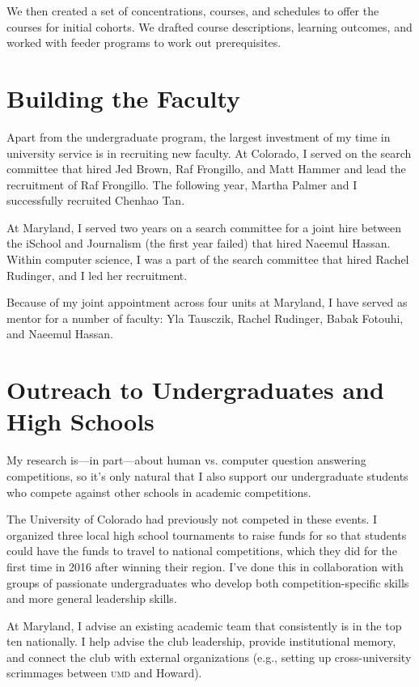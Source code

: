 \documentclass[11pt]{amsart}
\newcommand{\abr}[1]{\textsc{#1}}
\begin{document}
We then created a set of concentrations, courses, and schedules to offer the
courses for initial cohorts.  We drafted course descriptions, learning outcomes,
and worked with feeder programs to work out prerequisites.  

\section{Building the Faculty}

Apart from the undergraduate program, the largest investment of my
time in university service is in recruiting new faculty.
%
At Colorado, I served on the search committee that 
hired Jed Brown, Raf Frongillo, and Matt Hammer and lead the
recruitment of Raf Frongillo.
%
The following year, Martha Palmer and I successfully recruited Chenhao
Tan.

At Maryland, I served two years on a search committee for a joint hire
between the iSchool and Journalism (the first year failed) that hired
Naeemul Hassan.
%
Within computer science, I was a part of the search committee that
hired Rachel Rudinger, and I led her recruitment.

Because of my joint appointment across four units at Maryland, I have served as mentor
for a number of faculty: Yla Tausczik, Rachel Rudinger, Babak Fotouhi,
and Naeemul Hassan.


\section{Outreach to Undergraduates and High Schools}


My research is---in part---about human vs. computer question answering
competitions, so it's only natural that I also support our
undergraduate students who compete against other schools in academic
competitions.

The University of Colorado had previously not competed in these
events.
%
I organized three local high school tournaments to raise funds for so that
students could have the funds to travel to national competitions, which
they did for the first time in 2016 after winning their region.
%
I've done this in collaboration with groups of passionate
undergraduates who develop both competition-specific skills and more
general leadership skills.

At Maryland, I advise an existing academic team that
consistently is in the top ten nationally.
%
I help advise the club leadership, provide institutional memory, and
connect the club with external organizations (e.g., setting up
cross-university scrimmages between \abr{umd} and Howard).


%
%
\end{document}
